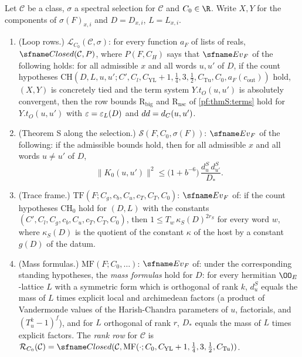 \begin{definition}\label{pf:thmS:defrows}
Let $\mathcal C$ be a class, $\sigma$ a spectral selection for $\mathcal C$ and $C_0\in\R$. Write $X,Y$ for the
components of $\sigma(F)_{x,i}$ and $D=D_{x,i}$, $L=L_{x,i}$.
\begin{enumerate}
\item (Loop rows.) $\mathcal{L}_{C_0}(\mathcal C,\sigma)$: for every function $a_F$ of lists of reals,
$\thmSClosed(\mathcal C,P)$, where $P(F,C_H)$ says that $\thmSEv_F$ of the following holds: for all admissible
$x$ and all words $u,u'$ of $D$, if the count hypotheses $\mathrm{CH}(D,L,u,u';C',C_l,C_{\mathrm{YL}}+1,\tfrac14,3,
\tfrac12,C_{\mathrm{Tu}},C_0,a_F(c_{\mathrm{out}}))$ hold, $(X,Y)$ is concretely tied and the term system
$Y.t_O(u,u')$ is absolutely convergent, then the row bounds $\mathrm{R}_{\mathrm{big}}$ and $\mathrm{R}_{\mathrm{nsc}}$ of
\cref{pf:thmS:terms} hold for $Y.t_O(u,u')$ with $\varepsilon=\varepsilon_{L}(D)$ and $dd=d_{C}(u,u')$.
\item (Theorem S along the selection.) $\mathcal{S}(F,C_0,\sigma(F))$: $\thmSEv_F$ of the following: if the admissible
bounds hold, then for all admissible $x$ and all words $u\ne u'$ of $D$,
\begin{equation}\label{eq:pf:thmS:S}
\|K_0(u,u')\|^2\le\bigl(1+b^{-6}\bigr)\,\frac{d^S_u\,d^S_{u'}}{D_*}.
\end{equation}
\item (Trace frame.) $\mathrm{TF}(F;C_g,c_b,C_u,c_T,C_T,C_0)$: $\thmSEv_F$ of: if the count hypotheses $\mathrm{CH}_0$ hold for $(D,L)$ with the constants
$(C',C_l,C_g,c_b,C_u,c_T,C_T,C_0)$, then $1\le T_w\,\kappa_S(D)^{2r_S}$ for every word $w$,
where $\kappa_S(D)$ is the quotient of the constant $\kappa$ of the host by a constant $g(D)$ of the datum.
\item (Mass formulas.) $\mathrm{MF}(F;C_0,\dots)$: $\thmSEv_F$ of: under the corresponding standing hypotheses, the \emph{mass
formulas} hold for $D$: for every hermitian $\OO_E$-lattice $L$ with a symmetric form which is orthogonal of rank $k$,
$d^S_u$ equals the mass of $L$ times explicit local and archimedean factors (a product of Vandermonde values of the
Harish-Chandra parameters of $u$, factorials, and $(T_u^k-1)^f$), and for $L$ orthogonal of rank $r$, $D_*$ equals the
mass of $L$ times explicit factors. The \emph{rank row} for $\mathcal C$ is
$\mathcal{R}_{C_0}(\mathcal C)=\thmSClosed(\mathcal C,\mathrm{MF}(\cdot;C_0,C_{\mathrm{YL}}+1,\tfrac14,3,\tfrac12,
C_{\mathrm{Tu}}))$.
\end{enumerate}
\end{definition}

